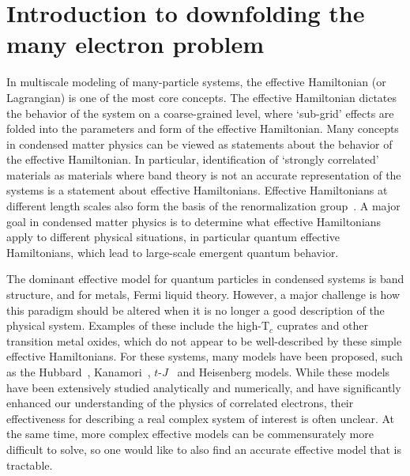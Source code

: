 \section{Introduction to downfolding the many electron problem}

In multiscale modeling of many-particle systems, the effective Hamiltonian (or Lagrangian) is one of the most core concepts. 
The effective Hamiltonian dictates the behavior of the system on a coarse-grained level, where `sub-grid' effects are folded into the parameters and form of the effective Hamiltonian. 
Many concepts in condensed matter physics can be viewed as statements about the behavior of the effective Hamiltonian. 
In particular, identification of `strongly correlated' materials as materials where band theory is not an accurate representation of the systems is a statement about effective Hamiltonians.
Effective Hamiltonians at different length scales also form the basis of the renormalization group~\cite{Wilson}.
A major goal in condensed matter physics is to determine what effective Hamiltonians apply to different physical situations, in particular quantum effective Hamiltonians, which lead to large-scale emergent quantum behavior. 

The dominant effective model for quantum particles in condensed systems is band structure, and for metals, Fermi liquid theory. 
However, a major challenge is how this paradigm should be altered when it is no longer a good description of the physical system.
Examples of these include the high-T$_c$ cuprates and other transition metal oxides, which do not appear to be well-described by these simple effective Hamiltonians. 
For these systems, many models have been proposed, such as the Hubbard~\cite{Hubbard1963}, Kanamori~\cite{Kanamori1963}, $t$-$J$~\cite{tJSpalek} and Heisenberg models.
While these models have been extensively studied analytically and numerically, and have significantly enhanced our understanding of the physics of correlated electrons, their effectiveness for describing a real complex system of interest is often unclear. 
At the same time, more complex effective models can be commensurately more difficult to solve,  so one would like to also find an accurate effective model that is tractable. 


